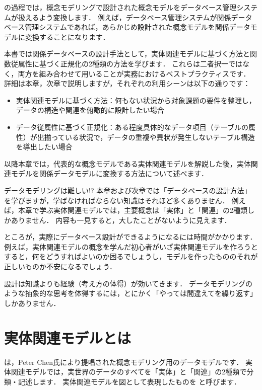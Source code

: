 の過程では，概念モデリングで設計された概念モデルをデータベース管理システムが扱えるよう変換します．
例えば，データベース管理システムが関係データベース管理システムであれば，あらかじめ設計された概念モデルを関係データモデルに変換することになります．


本書では関係データベースの設計手法として，実体関連モデルに基づく方法と関数従属性に基づく正規化の2種類の方法を学びます．
これらは二者択一ではなく，両方を組み合わせて用いることが実務におけるベストプラクティスです．
詳細は本章，次章で説明しますが，それぞれの利用シーンは以下の通りです：
\begin{itemize}
    \item 実体関連モデルに基づく方法：何もない状況から対象課題の要件を整理し，データの構造や関連を俯瞰的に設計したい場合
    \item データ従属性に基づく正規化：ある程度具体的なデータ項目（テーブルの属性）が出揃っている状況で，データの重複や異状が発生しないテーブル構造を導出したい場合
\end{itemize}

以降本章では，代表的な概念モデルである実体関連モデルを解説した後，実体関連モデルを関係データモデルに変換する方法について述べます．


\begin{notebox}{データモデリングは難しい!?}
本章および次章では「データベースの設計方法」を学びますが，学ばなければならない知識はそれほど多くありません．
例えば，本章で学ぶ実体関連モデルでは，主要概念は「実体」と「関連」の2種類しかありません．
内容も一見すると，大したことがないように見えます．

ところが，実際にデータベース設計ができるようになるには時間がかかります．
例えば，実体関連モデルの概念を学んだ初心者がいざ実体関連モデルを作ろうとすると，何をどうすればよいのか困るでしょうし，モデルを作ったもののそれが正しいものか不安になるでしょう．

設計は知識よりも経験（考え方の体得）が効いてきます．
データモデリングのような抽象的な思考を体得するには，とにかく「やっては間違えてを繰り返す」しかありません．
\end{notebox}



\section{実体関連モデルとは}\label{sec:what-is-er-model}
 は，Peter Chen氏により提唱された概念モデリング用のデータモデルです\cite{Chen1976}．
実体関連モデルでは，実世界のデータのすべてを「実体」と「関連」の2種類で分類・記述します．
実体関連モデルを図として表現したものを と呼びます．

